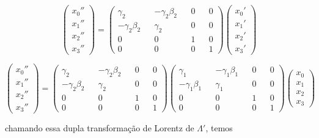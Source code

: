 \documentclass[10pt,a4paper]{article}
\begin{document}
  \begin{equation}\nonumber
 	\left(\begin{matrix}
 		x_0''\\
 		x_1''\\
 		x_2''\\
 		x_3''
 	\end{matrix}\right) = \left(\begin{matrix}
 		\gamma_2&&-\gamma_2\beta_2&&0&&0\\
 		-\gamma_2\beta_2&&\gamma_2&&0&&0\\
 		0&&0&&1&&0\\
 		0&&0&&0&&1
 	\end{matrix}\right)\left(\begin{matrix}
 	x_0'\\
 	x_1'\\
 	x_2'\\
 	x_3'
 \end{matrix}\right)
 \end{equation}
 
   \begin{equation}\nonumber
 	\left(\begin{matrix}
 		x_0''\\
 		x_1''\\
 		x_2''\\
 		x_3''
 	\end{matrix}\right) = \left(\begin{matrix}
 		\gamma_2&&-\gamma_2\beta_2&&0&&0\\
 		-\gamma_2\beta_2&&\gamma_2&&0&&0\\
 		0&&0&&1&&0\\
 		0&&0&&0&&1
 	\end{matrix}\right)\left(\begin{matrix}
 	\gamma_1&&-\gamma_1\beta_1&&0&&0\\
 	-\gamma_1\beta_1&&\gamma_1&&0&&0\\
 	0&&0&&1&&0\\
 	0&&0&&0&&1
 \end{matrix}\right)\left(\begin{matrix}
 x_0\\
 x_1\\
 x_2\\
 x_3
\end{matrix}\right)
 \end{equation}
 
 chamando essa dupla transformação de Lorentz de $\Lambda'$, temos
 
\end{document}
